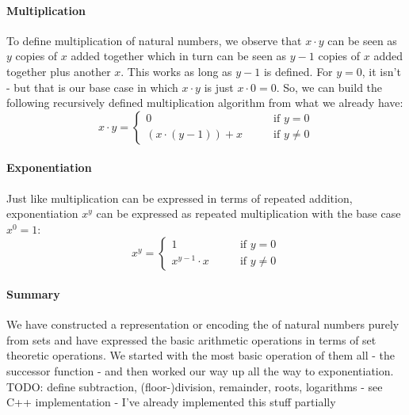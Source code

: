 \paragraph{Multiplication}
To define multiplication of natural numbers, we observe that $x \cdot y$ can be seen as $y$ copies of $x$ added together which in turn can be seen as $y-1$ copies of $x$ added together plus another $x$. This works as long as $y-1$ is defined. For $y=0$, it isn't - but that is our base case in which $x \cdot y$ is just $x \cdot 0 = 0$. So, we can build the following recursively defined multiplication algorithm from what we already have:
\begin{equation}
x \cdot y =\begin{cases}
 0                    & \qquad \text{if } y   =  0 \\
 (x \cdot (y-1)) + x  & \qquad \text{if } y \neq 0 
\end{cases}
\end{equation}

\paragraph{Exponentiation} Just like multiplication can be expressed in terms of repeated addition, exponentiation $x^y$ can be expressed as repeated multiplication with the base case $x^0 = 1$:
\begin{equation}
x^y =\begin{cases}
 1                  & \qquad \text{if } y   =  0 \\
 x ^{y-1}  \cdot x  & \qquad \text{if } y \neq 0 
\end{cases}
\end{equation}

\paragraph{Summary} We have constructed a representation or encoding the of natural numbers purely from sets and have expressed the basic arithmetic operations in terms of set theoretic operations. We started with the most basic operation of them all - the successor function - and then worked our way up all the way to exponentiation. TODO: define subtraction, (floor-)division, remainder, roots, logarithms - see C++ implementation - I've already implemented this stuff partially


